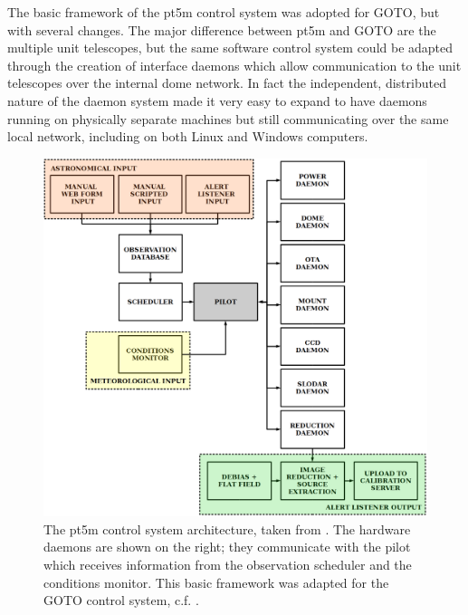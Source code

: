 \begin{colsection}
The basic framework of the pt5m control system was adopted for GOTO, but with several changes. The major difference between pt5m and GOTO are the multiple unit telescopes, but the same software control system could be adapted through the creation of interface daemons which allow communication to the unit telescopes over the internal dome network. In fact the independent, distributed nature of the daemon system made it very easy to expand to have daemons running on physically separate machines but still communicating over the same local network, including on both Linux and Windows computers.

\begin{figure}[p]
    \begin{center}
        \includegraphics[width=\linewidth]{images/pt5m_software.png}
    \end{center}
    \caption[The pt5m control system architecture]{
        The pt5m control system architecture, taken from \citet{pt5m}. The hardware daemons are shown on the right; they communicate with the pilot which receives information from the observation scheduler and the conditions monitor. This basic framework was adapted for the GOTO control system, c.f. .
    }\label{fig:pt5m_software}
\end{figure}

\end{colsection}

